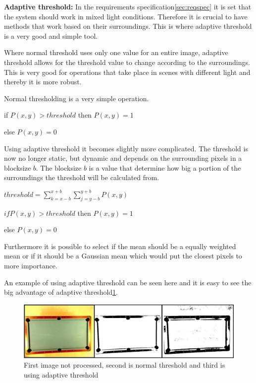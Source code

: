 \textbf{Adaptive threshold:}
In the requirements specification\ref{sec:reqspec} it is set that the system should work in mixed light conditions. Therefore it is crucial to have methods that work based on their surroundings. This is where adaptive threshold is a very good and simple tool.

Where normal threshold uses only one value for an entire image, adaptive threshold allows for the threshold value to change according to the surroundings. This is very good for operations that take place in scenes with different light and thereby it is more robust.

Normal thresholding is a very simple operation.

\begin{center}
	if $P(x,y) > threshold$ then $P(x,y) = 1$

	else $P(x,y) = 0$
\end{center}

Using adaptive threshold it becomes slightly more complicated. The threshold is now no longer static, but dynamic and depends on the surrounding pixels in a blocksize $b$. The blocksize $b$ is a value that determine how big a portion of the surroundings the threshold will be calculated from.

\begin{center}
	$threshold = \sum_{k=x-b}^{x+b} \sum_{j=y-b}^{y+b} P(x,y)$

	$if  P(x,y) > threshold$ then $P(x,y) = 1$

	else $P(x,y) = 0$
\end{center}

Furthermore it is possible to select if the mean should be a equally weighted mean or if it should be a Gaussian mean which would put the closest pixels to more importance.

An example of using adaptive threshold can be seen here and it is easy to see the big advantage of adaptive threshold\ref{fig:adaptivethreshold}. 

\begin{figure}[htb]
\begin{center}
\leavevmode
\includegraphics[width=1\textwidth]{images/adaptive_threshold.JPG}
\end{center}
\caption{First image not processed, second is normal threshold and third is using adaptive threshold}
\label{fig:adaptivethreshold}
\end{figure}

